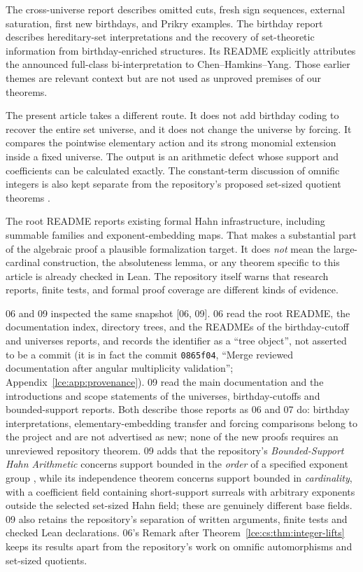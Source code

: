 \documentclass[11pt,letterpaper]{article}
\numberwithin{equation}{section}
\theoremstyle{definition}
\theoremstyle{remark}
\newcommand{\thref}[1]{Theorem~\ref{#1}}
\newcommand{\src}[1]{\textup{\textsf{\small[#1]}}}%
\begin{document}
The cross-universe report describes omitted cuts, fresh sign sequences,
external saturation, first new birthdays, and Prikry examples. The
birthday report describes hereditary-set interpretations and the recovery
of set-theoretic information from birthday-enriched structures. Its README
explicitly attributes the announced full-class bi-interpretation to
Chen--Hamkins--Yang. Those earlier themes are relevant context but are not
used as unproved premises of our theorems.

The present article takes a different route. It does not add birthday
coding to recover the entire set universe, and it does not change the
universe by forcing. It compares the pointwise elementary action and its
strong monomial extension inside a fixed universe. The output is an
arithmetic defect whose support and coefficients can be calculated exactly.
The constant-term discussion of omnific integers is also kept separate
from the repository's proposed set-sized quotient theorems
\cite{RepoQuotients}.

The root README reports existing formal Hahn infrastructure, including
summable families and exponent-embedding maps. That makes a substantial
part of the algebraic proof a plausible formalization target. It does
\emph{not} mean the large-cardinal construction, the absoluteness lemma,
or any theorem specific to this article is already checked in Lean.
The repository itself warns that research reports, finite tests, and
formal proof coverage are different kinds of evidence.

06 and 09 inspected the same snapshot \src{06, 09}. 06 read the root README,
the documentation index, directory trees, and the READMEs of the
birthday-cutoff and universes reports, and records the identifier as a
``tree object'', not asserted to be a commit (it is in fact the commit
\texttt{0865f04}, ``Merge reviewed documentation after angular multiplicity
validation''; Appendix~\ref{lce:app:provenance}). 09 read the main
documentation and the introductions and scope statements of the universes,
birthday-cutoffs and bounded-support reports. Both describe those reports as
06 and 07 do: birthday interpretations, elementary-embedding transfer and
forcing comparisons belong to the project and are not advertised as new;
none of the new proofs requires an unreviewed repository theorem. 09 adds
that the repository's \emph{Bounded-Support Hahn Arithmetic} concerns support
bounded in the \emph{order} of a specified exponent group \cite{RepoBounded},
while its independence theorem concerns support bounded in
\emph{cardinality}, with a coefficient field containing short-support
surreals with arbitrary exponents outside the selected set-sized Hahn
field; these are genuinely different base fields. 09 also retains the
repository's separation of written arguments, finite tests and checked Lean
declarations. 06's Remark after \thref{lce:cs:thm:integer-lifts} keeps its
results apart from the repository's work on omnific automorphisms and
set-sized quotients.
\end{document}

